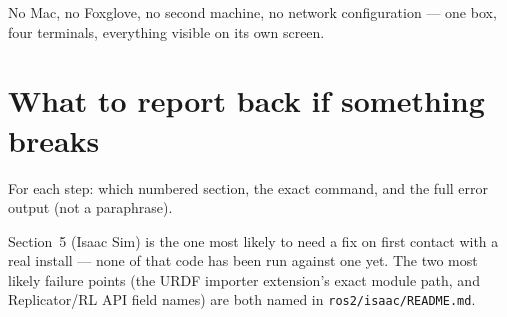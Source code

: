 \documentclass[11pt]{article}
\begin{document}
No Mac, no Foxglove, no second machine, no network configuration --- one
box, four terminals, everything visible on its own screen.

\section{What to report back if something breaks}

For each step: which numbered section, the exact command, and the full
error output (not a paraphrase).

Section~5 (Isaac Sim) is the one most likely to need a fix on first
contact with a real install --- none of that code has been run against
one yet. The two most likely failure points (the URDF importer
extension's exact module path, and Replicator/RL API field names) are
both named in \texttt{ros2/isaac/README.md}.
\end{document}
